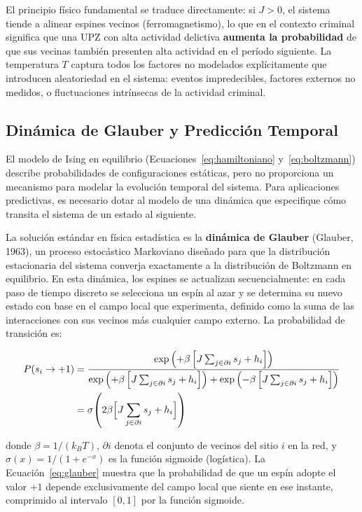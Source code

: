 \documentclass[12pt,a4paper]{article}
\begin{document}
El principio físico fundamental se traduce directamente: si $J > 0$, el sistema tiende a alinear espines vecinos (ferromagnetismo), lo que en el contexto criminal significa que una UPZ con alta actividad delictiva \textbf{aumenta la probabilidad} de que sus vecinas también presenten alta actividad en el período siguiente. La temperatura $T$ captura todos los factores no modelados explícitamente que introducen aleatoriedad en el sistema: eventos impredecibles, factores externos no medidos, o fluctuaciones intrínsecas de la actividad criminal.

\subsection{Dinámica de Glauber y Predicción Temporal}

El modelo de Ising en equilibrio (Ecuaciones~\ref{eq:hamiltoniano} y~\ref{eq:boltzmann}) describe probabilidades de configuraciones estáticas, pero no proporciona un mecanismo para modelar la evolución temporal del sistema. Para aplicaciones predictivas, es necesario dotar al modelo de una dinámica que especifique cómo transita el sistema de un estado al siguiente.

La solución estándar en física estadística es la \textbf{dinámica de Glauber} (Glauber, 1963), un proceso estocástico Markoviano diseñado para que la distribución estacionaria del sistema converja exactamente a la distribución de Boltzmann en equilibrio. En esta dinámica, los espines se actualizan secuencialmente: en cada paso de tiempo discreto se selecciona un espín al azar y se determina su nuevo estado con base en el campo local que experimenta, definido como la suma de las interacciones con sus vecinos más cualquier campo externo. La probabilidad de transición es:

\begin{align}\label{eq:glauber}
    P(s_i \to +1) &= \frac{\exp\left(+\beta\left[J\sum_{j \in \partial i} s_j + h_i\right]\right)}
{\exp\left(+\beta\left[J\sum_{j \in \partial i} s_j + h_i\right]\right) + 
 \exp\left(-\beta\left[J\sum_{j \in \partial i} s_j + h_i\right]\right)}\\
&= \sigma\!\left(2\beta\Bigl[J\sum_{j \in \partial i} s_j + h_i\Bigr]\right)
\end{align}

donde $\beta = 1/(k_B T)$, $\partial i$ denota el conjunto de vecinos del sitio $i$ en la red, y $\sigma(x) = 1/(1+e^{-x})$ es la función sigmoide (logística). La Ecuación~\ref{eq:glauber} muestra que la probabilidad de que un espín adopte el valor $+1$ depende exclusivamente del campo local que siente en ese instante, comprimido al intervalo $[0,1]$ por la función sigmoide.
\end{document}
